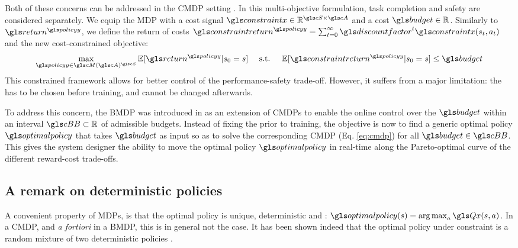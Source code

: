 Both of these concerns can be addressed in the \gls{CMDP} setting \parencite{BEUTLER1985236,Altman95constrainedmarkov}. In this multi-objective formulation, task completion and safety are considered separately. We equip the \gls{MDP} with a cost signal $\constraint \in \Real^{\cS\times \cA}$ and a cost  $\budget\in\Real$. Similarly to $\return^{\policy}$, we define the return of costs $\constraintreturn^{\policy} = \sum_{t=0}^\infty \discountfactor^t \constraint(s_t, a_t)$ and the new cost-constrained objective:
\begin{equation}
    \label{eq:cmdp}
    \begin{array}{lcr}
        \displaystyle \max_{\policy\in\cM(\cA)^{\cS}} \expectedvalue[\return^{\policy} | s_0=s] & \text{ s.t. } & \expectedvalue[\constraintreturn^{\policy} | s_0=s] \leq \budget
    \end{array}
\end{equation}
This constrained framework allows for better control of the performance-safety trade-off. However, it suffers from a major limitation: the  has to be chosen before training, and cannot be changed afterwards.

To address this concern, the \gls{BMDP} was introduced in \parencite{Boutilier_Lu:uai16} as an extension of \glspl{CMDP} to enable the online control over the  $\budget$ within an interval $\budgetspace \subset \Real$ of admissible budgets. Instead of fixing the  prior to training, the objective is now to find a generic optimal policy $\optimalpolicy$ that takes $\budget$ as input so as to solve the corresponding \gls{CMDP} (Eq. \eqref{eq:cmdp}) for all $\budget\in\budgetspace$. This gives the system designer the ability to move the optimal policy $\optimalpolicy$ in real-time along the Pareto-optimal curve of the different reward-cost trade-offs.

\subsection{A remark on deterministic policies}
%
A convenient property of \glspl{MDP}, is that the optimal policy is unique, deterministic and : $\optimalpolicy(s)=\argmax_{a}\Q(s,a)$.
In a \gls{CMDP}, and \textit{a fortiori} in a \gls{BMDP}, this is in general not the case. It has been shown indeed that the optimal policy under constraint is a random mixture of two deterministic policies \textcite[Theorem 4.4]{BEUTLER1985236}.

